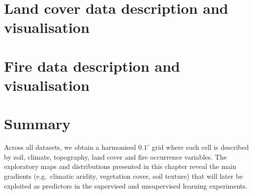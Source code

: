\section{Land cover data description and visualisation}


\section{Fire data description and visualisation}


\section{Summary}

Across all datasets, we obtain a harmonised $0.1^{\circ}$ grid where each
cell is described by soil, climate, topography, land cover and fire
occurrence variables. The exploratory maps and distributions presented
in this chapter reveal the main gradients (e.g.\ climatic aridity,
vegetation cover, soil texture) that will later be exploited as
predictors in the supervised and unsupervised learning experiments.
